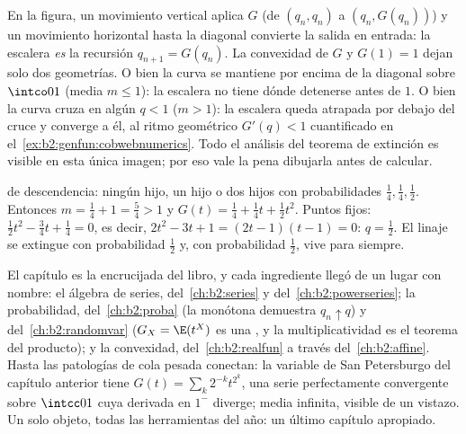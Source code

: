 \begin{remark}
En la figura, un movimiento vertical aplica $G$ (de $(q_n, q_n)$ a
$(q_n, G(q_n))$) y un movimiento horizontal hasta la diagonal
convierte la salida en entrada: la escalera \emph{es} la recursión
$q_{n+1} = G(q_n)$. La convexidad de $G$ y $G(1) = 1$ dejan solo dos
geometrías. O bien la curva se mantiene por encima de la diagonal
sobre $\intco01$ (media $m \leq 1$): la escalera no tiene dónde
detenerse antes de $1$. O bien la curva cruza en algún $q < 1$ ($m >
1$): la escalera queda atrapada por debajo del cruce y converge a él,
al ritmo geométrico $G'(q) < 1$ cuantificado en el~\cref{ex:b2:genfun:cobwebnumerics}. Todo el análisis del teorema de
extinción es visible en esta única imagen; por eso vale la pena
dibujarla antes de calcular.
\end{remark}

\begin{example}\label{ex:b2:genfun:branchingexample}
 de descendencia: ningún hijo, un hijo o dos hijos con
probabilidades $\frac14, \frac14, \frac12$. Entonces $m = \frac14 + 1
= \frac54 > 1$ y $G(t) = \frac14 + \frac14 t + \frac12 t^2$. Puntos
fijos: $\frac12 t^2 - \frac34 t + \frac14 = 0$, es decir, $2t^2 - 3t
+ 1 = (2t - 1)(t - 1) = 0$: $q = \frac12$. El linaje se extingue con
probabilidad $\frac12$ y, con probabilidad $\frac12$, vive para
siempre.
\end{example}

\begin{remark}
El capítulo es la encrucijada del libro, y cada ingrediente llegó de
un lugar con nombre: el álgebra de series, del~\cref{ch:b2:series} y
del~\cref{ch:b2:powerseries}; la probabilidad, del~\cref{ch:b2:proba} (la  monótona demuestra $q_n \uparrow
q$) y del~\cref{ch:b2:randomvar} ($G_X = \E(t^X)$ es una
, y la multiplicatividad es el teorema del producto); y la
convexidad, del~\cref{ch:b2:realfun} a través del~\cref{ch:b2:affine}. Hasta las patologías de cola pesada conectan: la
variable de San Petersburgo del capítulo anterior tiene $G(t) =
\sum_k2^{-k}t^{2^k}$, una serie perfectamente convergente sobre
$\intcc01$ cuya derivada en $1^-$ diverge; media infinita, visible de
un vistazo. Un solo objeto, todas las herramientas del año: un último
capítulo apropiado.
\end{remark}


